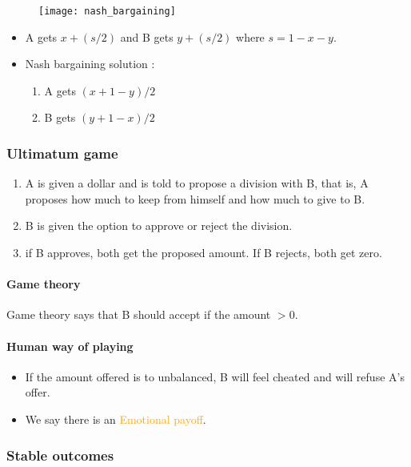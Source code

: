 \begin{figure}[H]
    \centering
    \texttt{[image: nash\_bargaining]}
\end{figure}

\begin{itemize}
\item A gets $x + (s/2)$ and B gets $y + (s/2)$ where $s = 1 - x - y$.
\item Nash bargaining solution :
	\begin{enumerate}
	\item A gets $(x + 1 - y)/2$
	\item B gets $(y + 1 - x)/2$
	\end{enumerate}
\end{itemize}

\subsubsection{Ultimatum game}

\begin{enumerate}
\item A is given a dollar and is told to propose a division with B, that is, A proposes how much to keep from himself and how much to give to B.
\item B is given the option to approve or reject the division.
\item if B approves, both get the proposed amount. If B rejects, both get zero.
\end{enumerate}

\paragraph{Game theory}

Game theory says that B should accept if the amount $> 0$.

\paragraph{Human way of playing}

\begin{itemize}
\item If the amount offered is to unbalanced, B will feel cheated and will refuse A's offer.
\item We say there is an \textcolor{orange}{Emotional payoff}.
\end{itemize}

\subsubsection{Stable outcomes}

